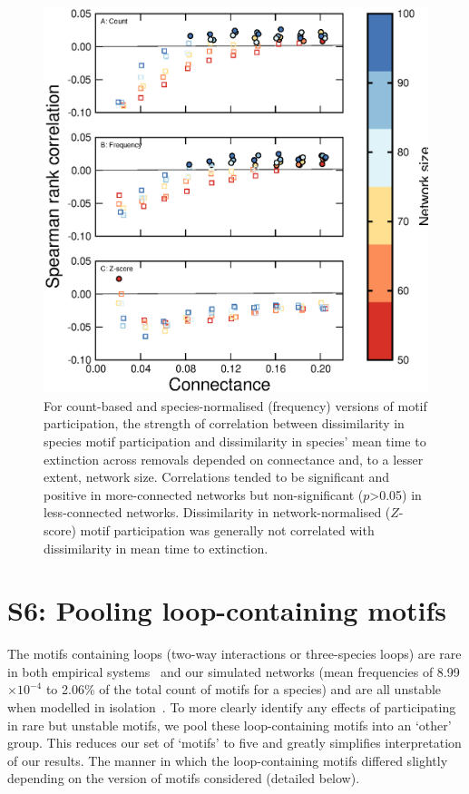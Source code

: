 \documentclass[12pt]{article}
\begin{document}
\begin{spacing}{2.0}
		\begin{figure}[hb!]
		    \centering
			\includegraphics[height=.66\textheight]{figures/mantel.eps}
			\caption{For count-based and species-normalised (frequency) versions of motif participation, the strength of correlation between  dissimilarity in species motif participation and dissimilarity in species' mean time to extinction across removals depended on connectance and, to a lesser extent, network size. Correlations tended to be significant and positive in more-connected networks but non-significant ($p$\textgreater0.05) in less-connected networks. Dissimilarity in network-normalised ($Z$-score) motif participation was generally not correlated with dissimilarity in mean time to extinction.}
			\label{Mantelfig}
			\end{figure}


\clearpage

\section*{S6: Pooling loop-containing motifs} 
	
	The motifs containing loops (two-way interactions or three-species loops) are rare in both empirical systems~\citep{Stouffer2007} and our simulated networks (mean frequencies of 8.99$\times10^{-4}$ to 2.06\% of the total count of motifs for a species) and are all unstable when modelled in isolation~\citep{Borrelli2015a}.
	To more clearly identify any effects of participating in rare but unstable motifs, we pool these loop-containing motifs into an `other' group.
	This reduces our set of `motifs' to five and greatly simplifies interpretation of our results.
	The manner in which the loop-containing motifs differed slightly depending on the version of motifs considered (detailed below).



\end{spacing}
\end{document}
